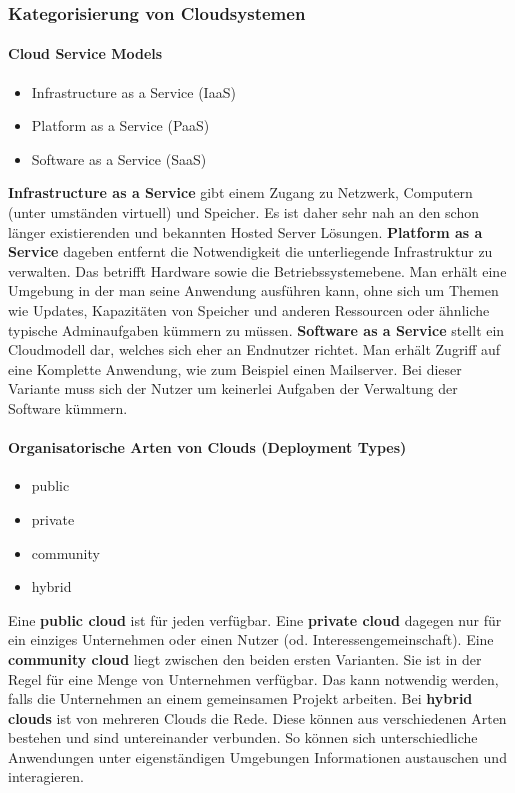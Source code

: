 \documentclass[a4paper,10pt]{article}
\begin{document}
\subsubsection{Kategorisierung von Cloudsystemen}

\paragraph{Cloud Service Models}

\begin{itemize}
 \item Infrastructure as a Service (IaaS)
 \item Platform as a Service (PaaS)
 \item Software as a Service (SaaS)
\end{itemize}

\textbf{Infrastructure as a Service} gibt einem Zugang zu Netzwerk, Computern (unter umständen virtuell) und Speicher.
Es ist daher sehr nah an den schon länger existierenden und bekannten Hosted Server Lösungen. 
\textbf{Platform as a Service} dageben entfernt die Notwendigkeit die unterliegende Infrastruktur zu verwalten.
Das betrifft Hardware sowie die Betriebssystemebene.
Man erhält eine Umgebung in der man seine Anwendung ausführen kann, ohne sich um Themen wie Updates, Kapazitäten von Speicher und anderen Ressourcen oder ähnliche typische Adminaufgaben kümmern zu müssen.
\textbf{Software as a Service} stellt ein Cloudmodell dar, welches sich eher an Endnutzer richtet.
Man erhält Zugriff auf eine Komplette Anwendung, wie zum Beispiel einen Mailserver.
Bei dieser Variante muss sich der Nutzer um keinerlei Aufgaben der Verwaltung der Software kümmern.

\paragraph{Organisatorische Arten von Clouds (Deployment Types)}

\begin{itemize}
 \item public
 \item private
 \item community
 \item hybrid
\end{itemize}

Eine \textbf{public cloud} ist für jeden verfügbar.
Eine \textbf{private cloud} dagegen nur für ein einziges Unternehmen oder einen Nutzer (od. Interessengemeinschaft).
Eine \textbf{community cloud} liegt zwischen den beiden ersten Varianten. 
Sie ist in der Regel für eine Menge von Unternehmen verfügbar.
Das kann notwendig werden, falls die Unternehmen an einem gemeinsamen Projekt arbeiten.
Bei \textbf{hybrid clouds} ist von mehreren Clouds die Rede.
Diese können aus verschiedenen Arten bestehen und sind untereinander verbunden.
So können sich unterschiedliche Anwendungen unter eigenständigen Umgebungen Informationen austauschen und interagieren.
\end{document}
